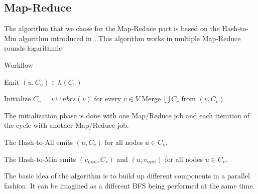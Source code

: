 \subsection{Map-Reduce}

The algorithm that we chose for the Map-Reduce part is based on the Hash-to-Min algorithm introduced in \cite{rastogi}. This algorithm works in multiple Map-Reduce rounds logarithmic

\begin{algorithm}
\caption{Workflow}
\label{algo:workflow}
\State Emit $(u, C_u) \in h(C_ v)$
\begin{algorithmic}[1]
\State Initialize $C_{v}$ = ${v} \cup nbrs(v)$ for every $v \in V$
\Repeat
\State Merge $\bigcup C_v$ from $(v, C_v)$
\end{algorithmic}
\end{algorithm}

The initialization phase is done with one Map/Reduce job and each iteration of the cycle with another Map/Reduce job.

The Hash-to-All emits $(u, C_v)$ for all nodes $u \in C_v$.

The Hash-to-Min emits $(v_{min}, C_v)$ and $(u, v_{min})$ for all nodes $u \in C_v$.

The basic idea of the algorithm is to build up different components in a parallel fashion. It can be imagined as a different BFS being performed at the same time.

